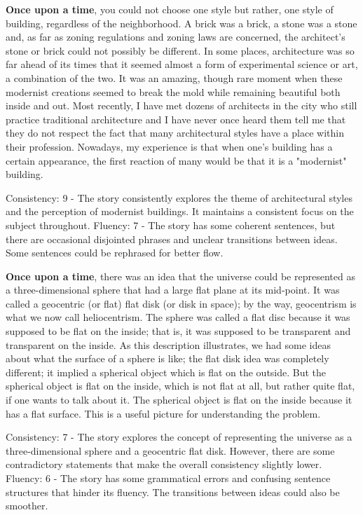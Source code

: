 \documentclass{article}
\begin{document}
\textbf{Once upon a time}, you could not choose one style but rather, one style of building, regardless of the neighborhood. A brick was a brick, a stone was a stone and, as far as zoning regulations and zoning laws are concerned, the architect's stone or brick could not possibly be different. In some places, architecture was so far ahead of its times that it seemed almost a form of experimental science or art, a combination of the two. It was an amazing, though rare moment when these modernist creations seemed to break the mold while remaining beautiful both inside and out. Most recently, I have met dozens of architects in the city who still practice traditional architecture and I have never once heard them tell me that they do not respect the fact that many architectural styles have a place within their profession. Nowadays, my experience is that when one's building has a certain appearance, the first reaction of many would be that it is a "modernist" building.

Consistency: 9 - The story consistently explores the theme of architectural styles and the perception of modernist buildings. It maintains a consistent focus on the subject throughout.
Fluency: 7 - The story has some coherent sentences, but there are occasional disjointed phrases and unclear transitions between ideas. Some sentences could be rephrased for better flow.

\textbf{Once upon a time}, there was an idea that the universe could be represented as a three-dimensional sphere that had a large flat plane at its mid-point. It was called a geocentric (or flat) flat disk (or disk in space); by the way, geocentrism is what we now call heliocentrism. The sphere was called a flat disc because it was supposed to be flat on the inside; that is, it was supposed to be transparent and transparent on the inside. As this description illustrates, we had some ideas about what the surface of a sphere is like; the flat disk idea was completely different; it implied a spherical object which is flat on the outside. But the spherical object is flat on the inside, which is not flat at all, but rather quite flat, if one wants to talk about it. The spherical object is flat on the inside because it has a flat surface. This is a useful picture for understanding the problem.

Consistency: 7 - The story explores the concept of representing the universe as a three-dimensional sphere and a geocentric flat disk. However, there are some contradictory statements that make the overall consistency slightly lower.
Fluency: 6 - The story has some grammatical errors and confusing sentence structures that hinder its fluency. The transitions between ideas could also be smoother.
\end{document}

